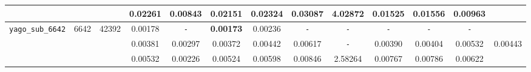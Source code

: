 \begin{table}
{\begin{tabular}{ l c c | c c c c c c c c c || c }
 &  &  & 0.02261 & 0.00843 & 0.02151 & 0.02324 & 0.03087 & 4.02872 & 0.01525 & 0.01556 & 0.00963 & \\
\hline
\verb|yago_sub_6642| & 6642 & 42392 & 0.00178 & \verb|-| & \textbf{0.00173} & 0.00236 & \verb|-| & \verb|-| & \verb|-| & \verb|-| & \verb|-| & \\
 &  &  & 0.00381 & 0.00297 & 0.00372 & 0.00442 & 0.00617 & \verb|-| & 0.00390 & 0.00404 & 0.00532 & 0.00443 \\
 &  &  & 0.00532 & 0.00226 & 0.00524 & 0.00598 & 0.00846 & 2.58264 & 0.00767 & 0.00786 & 0.00622 & \\
\hline
  \end{tabular}
}
\end{table}

\begin{table}
\hspace{-2cm}
\end{table}
